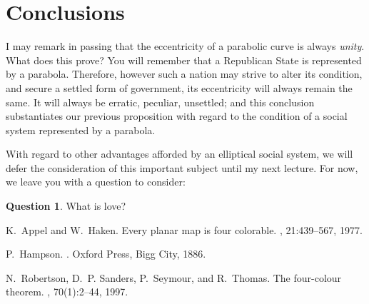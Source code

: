 \documentclass[draft]{jocg}
\theoremstyle{plain}
\theoremstyle{definition}
\newtheorem{question}{Question}
\begin{document}
\section{Conclusions}

I may remark in passing that the eccentricity of a parabolic curve is
always \emph{unity}. What does this prove? You will remember that a
Republican State is represented by a parabola. Therefore, however such
a nation may strive to alter its condition, and secure a settled form of
government, its eccentricity will always remain the same. It will always
be erratic, peculiar, unsettled; and this conclusion substantiates our
previous proposition with regard to the condition of a social system
represented by a parabola.

With regard to other advantages afforded by an elliptical social system,
we will defer the consideration of this important subject until my
next lecture.  For now, we leave you with a question to consider:

\begin{question}
  What is love?
\end{question}

%
%

\begin{thebibliography}{1}

K.~Appel and W.~Haken.
\newblock Every planar map is four colorable.
, 21:439--567, 1977.

P.~Hampson.
.
\newblock Oxford Press, Bigg City, 1886.

N.~Robertson, D.~P. Sanders, P.~Seymour, and R.~Thomas.
\newblock The four-colour theorem.
, 70(1):2--44, 1997.

\end{thebibliography}
\end{document}
